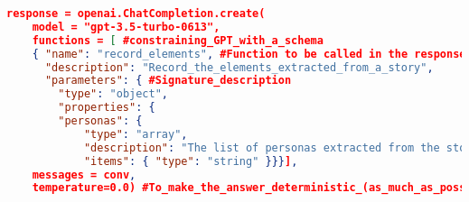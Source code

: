 \begin{lstlisting}[language=json,firstnumber=1]
response = openai.ChatCompletion.create(
    model = "gpt-3.5-turbo-0613",
    functions = [ #constraining_GPT_with_a_schema
	{ "name": "record_elements", #Function to be called in the response
	  "description": "Record_the_elements_extracted_from_a_story",
	  "parameters": { #Signature_description
		"type": "object",
		"properties": {
		"personas": {
			"type": "array",
			"description": "The list of personas extracted from the story",
			"items": { "type": "string" }}}],
    messages = conv,
    temperature=0.0) #To_make_the_answer_deterministic_(as_much_as_possible)
\end{lstlisting}
